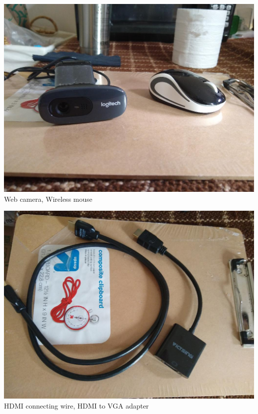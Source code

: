 \documentclass[t]{beamer}
\newcommand{\htarget}[2]{\hypertarget{#1}{#2}}
\begin{document}
\begin{frame}\htarget{webcam}{} \begin{center}
\includegraphics[height=0.8\textheight]{webcamera_mouse_mini.jpg} \\
Web camera, Wireless mouse
\end{center} \end{frame}
\begin{frame}\htarget{hdmi}{} \begin{center}
\includegraphics[height=0.8\textheight]{hdmi_wire_mini.jpg} \\
HDMI connecting wire, HDMI to VGA adapter
\end{center} \end{frame}
\end{document}
